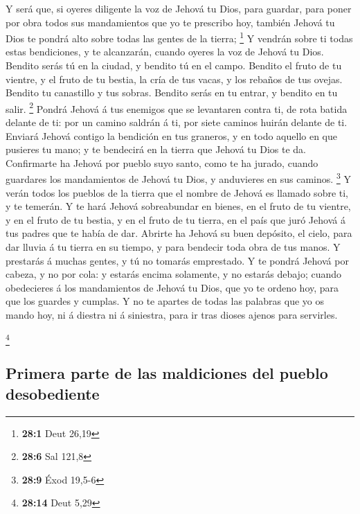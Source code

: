  Y será que, si oyeres diligente la voz de Jehová tu Dios,
para guardar, para poner por obra todos sus mandamientos que yo te
prescribo hoy, también Jehová tu Dios te pondrá alto sobre todas las
gentes de la tierra; \footnote{\textbf{28:1} Deut 26,19} 
Y vendrán sobre ti todas estas bendiciones, y te alcanzarán, cuando
oyeres la voz de Jehová tu Dios.  Bendito serás tú en la
ciudad, y bendito tú en el campo.  Bendito el fruto de tu
vientre, y el fruto de tu bestia, la cría de tus vacas, y los rebaños de
tus ovejas.  Bendito tu canastillo y tus sobras.
 Bendito serás en tu entrar, y bendito en tu salir.
\footnote{\textbf{28:6} Sal 121,8}  Pondrá Jehová á tus
enemigos que se levantaren contra ti, de rota batida delante de ti: por
un camino saldrán á ti, por siete caminos huirán delante de ti.
 Enviará Jehová contigo la bendición en tus graneros, y en
todo aquello en que pusieres tu mano; y te bendecirá en la tierra que
Jehová tu Dios te da.  Confirmarte ha Jehová por pueblo
suyo santo, como te ha jurado, cuando guardares los mandamientos de
Jehová tu Dios, y anduvieres en sus caminos. \footnote{\textbf{28:9}
  Éxod 19,5-6}  Y verán todos los pueblos de la tierra
que el nombre de Jehová es llamado sobre ti, y te temerán.
 Y te hará Jehová sobreabundar en bienes, en el fruto de
tu vientre, y en el fruto de tu bestia, y en el fruto de tu tierra, en
el país que juró Jehová á tus padres que te había de dar.
 Abrirte ha Jehová su buen depósito, el cielo, para dar
lluvia á tu tierra en su tiempo, y para bendecir toda obra de tus manos.
Y prestarás á muchas gentes, y tú no tomarás emprestado. 
Y te pondrá Jehová por cabeza, y no por cola: y estarás encima
solamente, y no estarás debajo; cuando obedecieres á los mandamientos de
Jehová tu Dios, que yo te ordeno hoy, para que los guardes y cumplas.
 Y no te apartes de todas las palabras que yo os mando
hoy, ni á diestra ni á siniestra, para ir tras dioses ajenos para
servirles.

\footnote{\textbf{28:14} Deut 5,29}

\hypertarget{primera-parte-de-las-maldiciones-del-pueblo-desobediente}{%
\subsection{Primera parte de las maldiciones del pueblo
desobediente}\label{primera-parte-de-las-maldiciones-del-pueblo-desobediente}}


